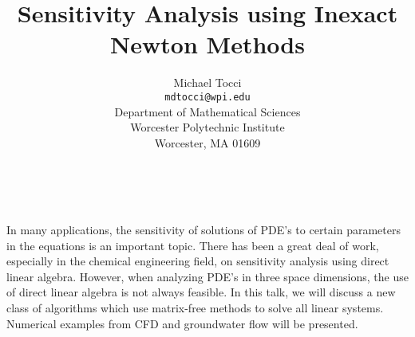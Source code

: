 \documentclass[11pt]{article}
\date{ ~ \hspace{-4mm}}
\title{Sensitivity Analysis using Inexact Newton Methods  }
\author{Michael Tocci \\ {\tt  mdtocci@wpi.edu} \\ Department of Mathematical Sciences  \\  Worcester Polytechnic Institute  \\  Worcester, MA 01609}
\begin{document}
\maketitle
\thispagestyle{empty}





 



In many applications, the sensitivity of solutions of PDE's
to certain parameters in the equations is an important topic.
There has been a great deal of work, especially in the chemical
engineering field, on sensitivity analysis using direct
linear algebra.  However, when analyzing PDE's in three space
dimensions, the use of direct linear algebra is not always feasible.
In this talk, we will discuss a new class of algorithms which use
matrix-free methods to solve all linear systems.  Numerical examples
from CFD and groundwater flow will be presented.  
\end{document}
